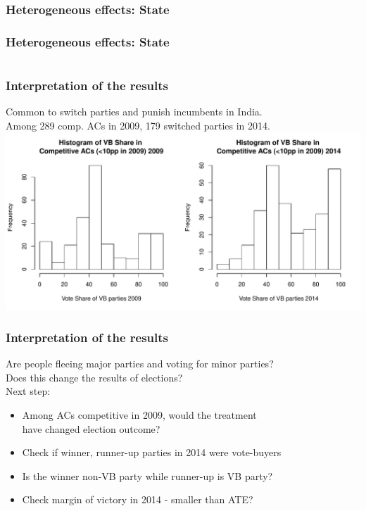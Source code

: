 \documentclass{beamer}
\begin{document}
\begin{frame}
\frametitle{Heterogeneous effects: State}
\end{frame}

\begin{frame}
\frametitle{Heterogeneous effects: State}
\begin{columns}[T] %
\begin{column}{.40\textwidth}
\scalebox{.6}{
\vbox{%
\vspace{-40pt}
}}
\end{column}%
\hfill%
\begin{column}{.48\textwidth}
\scalebox{.6}{
\vbox{%
\vspace{-40pt}
}}
\end{column}%
\end{columns}
\end{frame}

\begin{frame}
\frametitle{Interpretation of the results}
Common to switch parties and punish incumbents in India.\\
Among 289 comp. ACs in 2009, 179 switched parties in 2014.\\
\includegraphics[scale=.45]{../Figures/VBcomp.pdf}
\end{frame}

\begin{frame}
\frametitle{Interpretation of the results}

Are people fleeing major parties and voting for minor parties?\\
Does this change the results of elections? \\
\medskip
Next step: 
\begin{itemize}
\item Among ACs competitive in 2009, would the treatment \\have changed election outcome?\\
\item Check if winner, runner-up parties in 2014 were vote-buyers
\item Is the winner non-VB party while runner-up is VB party?
\item Check margin of victory in 2014 - smaller than ATE?
\end{itemize}
\end{frame}
\end{document}
